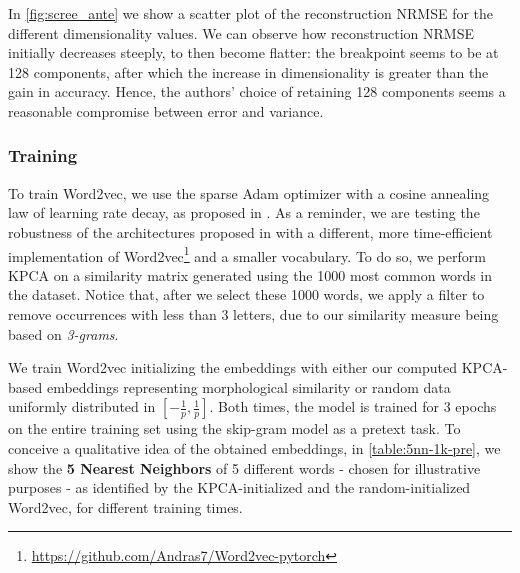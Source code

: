 In \cref{fig:scree_ante} we show a scatter plot of the reconstruction NRMSE for the different dimensionality values.
We can observe how reconstruction NRMSE initially decreases steeply, to then become flatter: the breakpoint seems to be at 128 components, after which the increase in dimensionality is greater than the gain in accuracy. Hence, the authors' choice of retaining 128 components seems a reasonable compromise between error and variance.

\subsubsection{Training}

To train Word2vec, we use the sparse Adam optimizer with a cosine annealing law of learning rate decay, as proposed in \cite{loshchilov_sgdr_2016}. 
As a reminder, we are testing the robustness of the architectures proposed in \cite{gupta_improving_2019} with a different, more time-efficient implementation of Word2vec\footnote{\url{https://github.com/Andras7/Word2vec-pytorch}} and a smaller vocabulary. To do so, we perform KPCA on a similarity matrix generated using the 1000 most common words in the dataset. Notice that, after we select these 1000 words, we apply a filter to remove occurrences with less than 3 letters, due to our similarity measure being based on \textit{3-grams}.

We train Word2vec initializing the embeddings with either our computed KPCA-based embeddings representing morphological similarity or random data uniformly distributed in $[-\frac{1}{p}, \frac{1}{p}]$. Both times, the model is trained for 3 epochs on the entire training set using the skip-gram model as a pretext task.
To conceive a qualitative idea of the obtained embeddings, in \cref{table:5nn-1k-pre}, we show the \textbf{5 Nearest Neighbors} of 5 different words - chosen for illustrative purposes - as identified by the KPCA-initialized and the random-initialized Word2vec, for different training times. 


